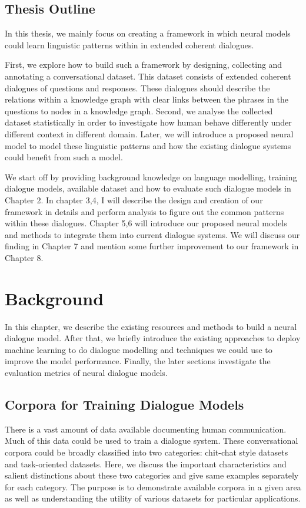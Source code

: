 \documentclass[bsc,frontabs,twoside,singlespacing,parskip,deptreport]{infthesis}     %
\begin{document}
\section {Thesis Outline}

In this thesis, we mainly focus on creating a framework in which neural models could learn linguistic patterns within in extended coherent dialogues.

First, we explore how to build such a framework by designing, collecting and annotating a conversational dataset. This dataset consists of extended coherent dialogues of questions and responses. These dialogues should describe the relations within a knowledge graph with clear links between the phrases in the questions to nodes in a knowledge graph. Second, we analyse the collected dataset statistically in order to investigate how human behave differently under different context in different domain. Later, we will introduce a proposed neural model to model these linguistic patterns and how the existing dialogue systems could benefit from such a model.

We start off by providing background knowledge on language modelling, training dialogue models, available dataset and how to evaluate such dialogue models in Chapter 2. In chapter 3,4, I will describe the design and creation of our framework in details and perform analysis to figure out the common patterns within these dialogues. Chapter 5,6 will introduce our proposed neural models and methods to integrate them into current dialogue systems. We will discuss our finding in Chapter 7 and mention some further improvement to our framework in Chapter 8.

\chapter{Background}

In this chapter, we describe the existing resources and methods to build a neural dialogue model. After that, we briefly introduce the existing approaches to deploy machine learning to do dialogue modelling and techniques we could use to improve the model performance. Finally, the later sections investigate the evaluation metrics of neural dialogue models.

\section{Corpora for Training Dialogue Models}

There is a vast amount of data available documenting human communication. Much of this data could be used to train a dialogue system. These conversational corpora could be broadly classified into two categories: chit-chat style datasets and task-oriented datasets. Here, we discuss the important characteristics and salient distinctions about these two categories and give same examples separately for each category. The purpose is to demonstrate available corpora in a given area as well as understanding the utility of various datasets for particular applications.
\end{document}
